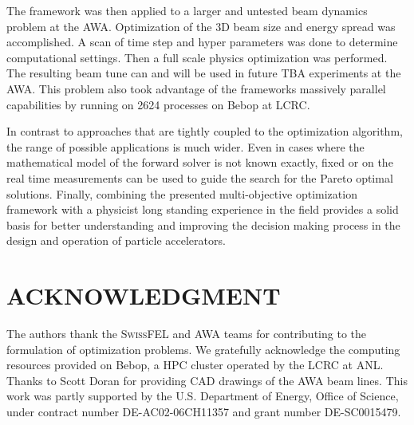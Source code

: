 \documentclass[%
reprint,
amsmath,amssymb,
aps,
]{revtex4-1}
\begin{document}
%
%  
%

The framework was then applied to a larger and untested beam dynamics problem at the AWA.
Optimization of the 3D beam size and energy spread was accomplished.
A scan of time step and hyper parameters was done to determine computational settings.
Then a full scale physics optimization was performed.
The resulting beam tune can and will be used in future TBA experiments at the AWA.
This problem also took advantage of the frameworks massively parallel capabilities by
running on 2624 processes on Bebop at LCRC.

In contrast to approaches that are tightly coupled to the optimization
  algorithm, the range of possible applications is much wider.
Even in cases where the mathematical model of the forward solver is not known
  exactly, fixed or on the real time measurements can be used to guide the
  search for the Pareto optimal solutions.
Finally, combining the presented multi-objective optimization framework with
  a physicist long standing experience in the field provides a solid basis
  for better understanding and improving the decision making process in the
  design and operation of particle accelerators.


\section{ACKNOWLEDGMENT}

The authors thank the \textsc{SwissFEL} and AWA teams for contributing to the
  formulation of optimization problems. 
  We gratefully acknowledge the computing resources provided on Bebop,
  a HPC cluster operated by the LCRC at ANL.
  Thanks to Scott Doran for providing CAD drawings of the AWA beam lines.
  This work was partly supported by the 
  U.S. Department of Energy, Office of Science, under 
  contract number DE-AC02-06CH11357 and grant number DE-SC0015479. 
\end{document}
